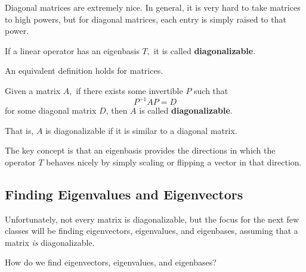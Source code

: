 Diagonal matrices are extremely nice. In general, it is very hard to take matrices to high powers, but for diagonal matrices, each entry is simply raised to that power.

\begin{definition}
If a linear operator has an eigenbasis $T,$ it is called \textbf{diagonalizable}.
\end{definition}

An equivalent definition holds for matrices.

\begin{definition}
Given a matrix $A,$ if there exists some invertible $P$ such that \[P^{-1}AP = D\] for some diagonal matrix $D$, then $A$ is called \textbf{diagonalizable}.
\end{definition}

That is, $A$ is diagonalizable if it is similar to a diagonal matrix. 

The key concept is that an eigenbasis provides the directions in which the operator $T$ behaves nicely by simply scaling or flipping a vector in that direction.
\subsection{Finding Eigenvalues and Eigenvectors}
 Unfortunately, not every matrix is diagonalizable, but the focus for the next few classes will be finding eigenvectors, eigenvalues, and eigenbases, assuming that a matrix \emph{is} diagonalizable.

\begin{qq}
How do we find eigenvectors, eigenvalues, and eigenbases?
\end{qq}

